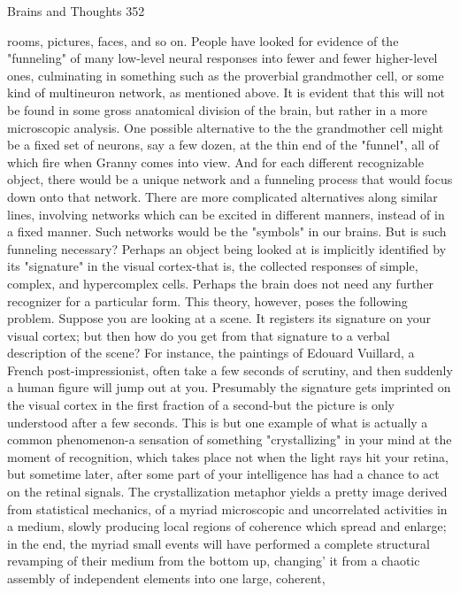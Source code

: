 Brains and Thoughts                                                                        352

rooms, pictures, faces, and so on. People have looked for evidence of the "funneling" of
many low-level neural responses into fewer and fewer higher-level ones, culminating in
something such as the proverbial grandmother cell, or some kind of multineuron network,
as mentioned above. It is evident that this will not be found in some gross anatomical
division of the brain, but rather in a more microscopic analysis.
  One possible alternative to the the grandmother cell might be a fixed set of neurons, say
a few dozen, at the thin end of the "funnel", all of which fire when Granny comes into
view. And for each different recognizable object, there would be a unique network and a
funneling process that would focus down onto that network. There are more complicated
alternatives along similar lines, involving networks which can be excited in different
manners, instead of in a fixed manner. Such networks would be the "symbols" in our
brains.
  But is such funneling necessary? Perhaps an object being looked at is implicitly
identified by its "signature" in the visual cortex-that is, the collected responses of simple,
complex, and hypercomplex cells. Perhaps the brain does not need any further recognizer
for a particular form. This theory, however, poses the following problem. Suppose you
are looking at a scene. It registers its signature on your visual cortex; but then how do you
get from that signature to a verbal description of the scene? For instance, the paintings of
Edouard Vuillard, a French post-impressionist, often take a few seconds of scrutiny, and
then suddenly a human figure will jump out at you. Presumably the signature gets
imprinted on the visual cortex in the first fraction of a second-but the picture is only
understood after a few seconds. This is but one example of what is actually a common
phenomenon-a sensation of something "crystallizing" in your mind at the moment of
recognition, which takes place not when the light rays hit your retina, but sometime later,
after some part of your intelligence has had a chance to act on the retinal signals.
  The crystallization metaphor yields a pretty image derived from statistical mechanics,
of a myriad microscopic and uncorrelated activities in a medium, slowly producing local
regions of coherence which spread and enlarge; in the end, the myriad small events will
have performed a complete structural revamping of their medium from the bottom up,
changing' it from a chaotic assembly of independent elements into one large, coherent,

